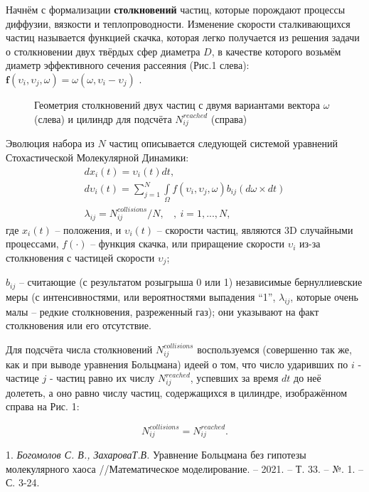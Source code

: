 Начнём с формализации \textbf{столкновений} частиц, которые порождают процессы диффузии, вязкости и теплопроводности.  Изменение скорости сталкивающихся частиц называется функцией скачка, которая легко получается из решения задачи о столкновении двух твёрдых сфер диаметра $ D $, в качестве которого возьмём диаметр эффективного сечения рассеяния (Рис.1 слева):
$\textbf{f}(\textbf{$\upsilon_{i}$},\textbf{$\upsilon_{j}$},\textbf{$\omega$}) = \textbf{$\omega$} (\textbf{$\omega$},\textbf{$\upsilon_{i}$} - \textbf{$\upsilon_{j}$})$ .\\
\begin{figure}[h!]%
	\caption{Геометрия столкновений двух частиц с двумя вариантами вектора $\omega$ (слева) и цилиндр для подсчёта $N_{ij}^{reached}$ (справа)}
\end{figure}

Эволюция набора из $N$ частиц описывается следующей системой  уравнений Стохастической Молекулярной Динамики:
\begin{eqnarray}\label{SMD}
	 dx_{i}(t) = \upsilon_{i}(t) dt ,\ \ \  \nonumber \\
	 d\upsilon_{i}(t) = \sum\limits_{j=1}^N\int \limits_\Omega f(\upsilon_{i},\upsilon_{j},\omega)b_{ij}(d\omega\times dt) %
	 \\
	 \lambda_{ij} =N_{ij}^{collisions}/N , \ \ \ \ , \ i=1,...,N,\nonumber
  \end{eqnarray}
  где $x_{i}(t)$ -- положения, и $\upsilon_{i}(t)$ -- скорости частиц, являются 3D случайными процессами,
 $f(\cdot)$ -- функция скачка, или приращение скорости $\upsilon_{i}$ из-за столкновения с частицей скорости $\upsilon_{j}$;

 $b_{ij}$ -- считающие (с результатом розыгрыша 0 или 1) независимые бернуллиевские меры (с интенсивностями, или вероятностями выпадения ``1'',  $\lambda_{ij}$, которые  очень малы -- редкие столкновения, разреженный газ); они указывают на факт столкновения или его отсутствие.



Для подсчёта числа столкновений $N_{ij}^{collisions}$  воспользуемся  (совершенно так же, как и при выводе уравнения Больцмана)
идеей о том, что число ударивших по $ i $ - частице  $ j $ - частиц равно их числу $N_{ij}^{reached}$, успевших за  время $ dt $ до неё долететь,
а оно равно числу частиц, содержащихся в  цилиндре, изображённом справа на Рис. 1: %

 \begin{equation}\label{Nreached}
 N_{ij}^{collisions} = N_{ij}^{reached}.
\end{equation}




\litlist

1. {\it Богомолов С. В., ЗахароваТ.В.}
 Уравнение Больцмана без гипотезы молекулярного хаоса //Математическое моделирование. – 2021. – Т. 33. – №. 1. – С. 3-24.
